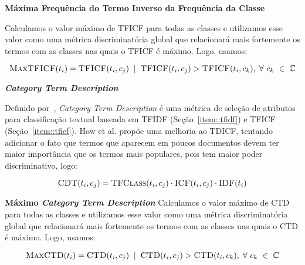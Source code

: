 \begin{description}

\item{\textbf{Máxima Frequência do Termo Inverso da Frequência da Classe}}%
\label{item::maxtfidf}

Calculamos o valor máximo de \textsc{TFICF} para todas as classes e utilizamos esse valor como uma métrica discriminatória global que relacionará mais fortemente os termos com as classes nas quais o \textsc{TFICF} é máximo. Logo, usamos:

\begin{equation}\label{eqn::maxdom}
 \textsc{MaxTFICF}(t_i) = \textsc{TFICF}(t_i,c_j) \; \; | \;\; \textsc{TFICF}(t_i, c_j) > \textsc{TFICF}(t_i, c_k), \; \forall\ c_k\ \in\ \mathbb{C}
\end{equation}



\item{\textbf{\textit{Category Term Description}}}
\label{item::ctd}

Definido por~\cite{ChihHow04}, \textit{Category Term Description} é uma métrica de seleção de atributos para classificação textual baseada em \textsc{TFIDF} (Seção~\ref{item::tfidf}) e \textsc{TFICF} (Seção~\ref{item::tficf}). How et al. propõe uma melhoria ao TDICF, tentando adicionar o fato que termos que aparecem em poucos documentos devem ter maior importância que os termos mais populares, pois tem maior poder discriminativo, logo:

\begin{equation}\label{eqn::cdt}
 \textsc{CDT}(t_i, c_j) = \textsc{TFClass}(t_i, c_j) \cdot \textsc{ICF}(t_i, c_j) \cdot \textsc{IDF}(t_i)
\end{equation}

\item{\textbf{Máximo \textit{Category Term Description}}}
\label{item::maxctd}
Calculamos o valor máximo de \textsc{CTD} para todas as classes e utilizamos esse valor como uma métrica discriminatória global que relacionará mais fortemente os termos com as classes nas quais o \textsc{CTD} é máximo. Logo, usamos:

\begin{equation}\label{eqn::maxdom}
 \textsc{MaxCTD}(t_i) = \textsc{CTD}(t_i,c_j) \; \; | \;\; \textsc{CTD}(t_i, c_j) > \textsc{CTD}(t_i, c_k), \; \forall\ c_k\ \in\ \mathbb{C}
\end{equation}


\end{description}

